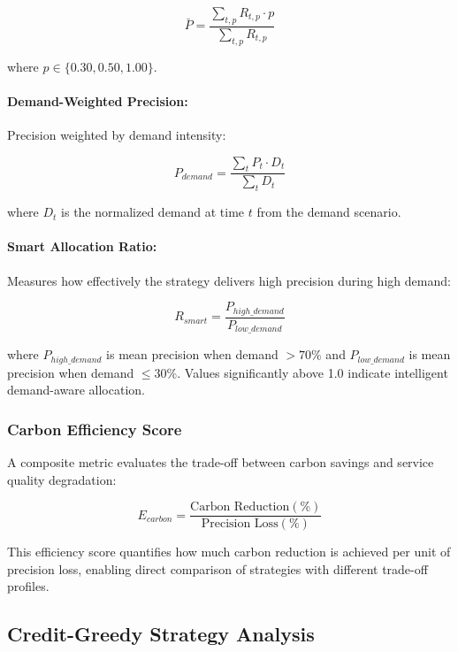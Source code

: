 \begin{equation}
    \bar{P} = \frac{\sum_{t,p} R_{t,p} \cdot p}{\sum_{t,p} R_{t,p}}
\end{equation}

where $p \in \{0.30, 0.50, 1.00\}$.

\paragraph{Demand-Weighted Precision:} Precision weighted by demand intensity:

\begin{equation}
    P_{demand} = \frac{\sum_{t} P_t \cdot D_t}{\sum_{t} D_t}
\end{equation}

where $D_t$ is the normalized demand at time $t$ from the demand scenario.

\paragraph{Smart Allocation Ratio:} Measures how effectively the strategy delivers high precision during high demand:

\begin{equation}
    R_{smart} = \frac{P_{high\_demand}}{P_{low\_demand}}
\end{equation}

where $P_{high\_demand}$ is mean precision when demand $> 70\%$ and $P_{low\_demand}$ is mean precision when demand $\leq 30\%$. Values significantly above 1.0 indicate intelligent demand-aware allocation.

\subsubsection{Carbon Efficiency Score}

A composite metric evaluates the trade-off between carbon savings and service quality degradation:

\begin{equation}
    E_{carbon} = \frac{\text{Carbon Reduction} (\%)}{\text{Precision Loss} (\%)}
\end{equation}

This efficiency score quantifies how much carbon reduction is achieved per unit of precision loss, enabling direct comparison of strategies with different trade-off profiles.


\subsection{Credit-Greedy Strategy Analysis}

